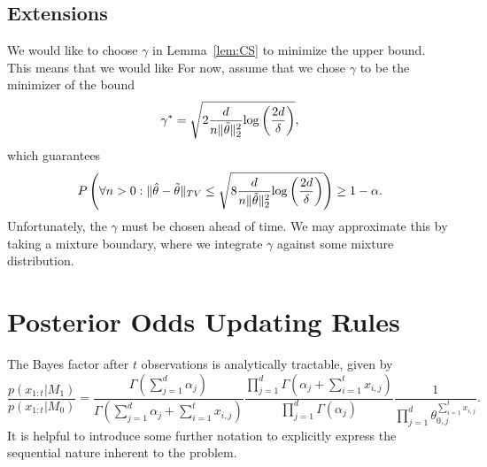 \documentclass[11pt]{article}
\def\log{{\rm log}}
\begin{document}
\subsection{Extensions}
We would like to choose $\gamma$ in Lemma~\ref{lem:CS} to minimize the upper bound. This means that we would like
For now, assume that we chose $\gamma$ to be the minimizer of the bound
\[
  \gamma^* = \sqrt{ 2\frac{d}{n \Vert \tilde\theta\Vert_2^2}\log\left(\frac{2d}{\delta}\right)},
\]
which guarantees
\begin{align*}
P  \left( \forall n > 0: \Vert\hat\theta - \tilde\theta\Vert_{TV}
  \leq
  \sqrt{ 8\frac{d}{n \Vert \tilde\theta\Vert_2^2}\log\left(\frac{2d}{\delta}\right)}
  \right) \geq 1-\alpha.
\end{align*}
Unfortunately, the $\gamma$ must be chosen ahead of time. We may approximate this by taking a mixture boundary, where we integrate $\gamma$ against some mixture distribution. 





\appendix
\section{Posterior Odds Updating Rules}
\label{app:posterior_odds}
The Bayes factor after $t$ observations is analytically tractable, given by
\begin{equation}
  \label{eq:bayes_factor}
 \frac{p(x_{1:t}|M_1)}{p(x_{1:t}|M_0)} = \frac{\Gamma(\sum_{j=1}^{d} \alpha_j)}{\Gamma(\sum_{j=1}^{d} \alpha_j + \sum_{i=1}^{t}x_{i,j})}\frac{\prod_{j=1}^{d}\Gamma(\alpha_j + \sum_{i=1}^{t}x_{i,j} )}{\prod_{j=1}^{d}\Gamma(\alpha_j )}\frac{1}{\prod_{j=1}^{d} \theta_{0,j}^{\sum_{i=1}^{t}x_{i,j}}}.
\end{equation}
It is helpful to introduce some further notation to explicitly express the sequential nature inherent to the problem.
\end{document}
